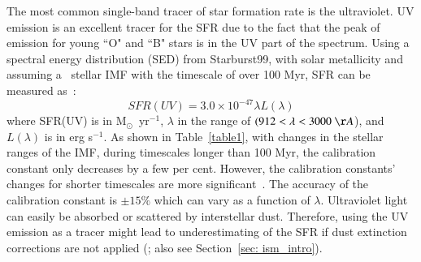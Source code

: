 The most common single-band tracer of star formation rate is the ultraviolet.
UV emission is an excellent tracer for the SFR due to the fact that the peak of emission for young  ``O" and ``B" stars is in the UV part of the spectrum. %
Using a spectral energy distribution (SED) from Starburst99, with solar metallicity and assuming a~\cite{Kroupa01} stellar IMF with the timescale of over 100 Myr, SFR can be measured as~\citep{Leitherer99}:
\begin{equation}
SFR(UV) = 3.0 \times 10^{-47}\lambda L(\lambda)
\end{equation}
where SFR(UV) is in M$_{\odot}$~yr$^{-1}$, $\lambda$ in the range of $(912< \lambda < 3000~\AA$), and $L(\lambda)$ is in erg s$^{-1}$. %
As shown in Table~\ref{table1}, with changes in the stellar ranges of the IMF, during timescales longer than 100 Myr, the calibration constant only decreases by a few per cent.
However, the calibration constants' changes for shorter timescales are more significant~\citep{Calzetti13}. 
The accuracy of the calibration constant is $\pm 15\%$ which can vary as a function of $\lambda$.  %
Ultraviolet light can easily be absorbed or scattered by interstellar dust. 
Therefore, using the UV emission as a tracer might lead to underestimating of the SFR if dust extinction corrections are not applied (\cite{Kennicutt12}; also see Section~\ref{sec: ism_intro}). 

